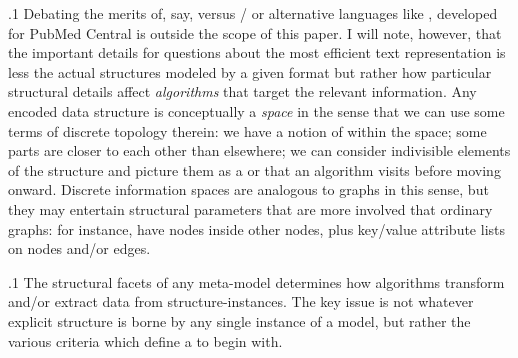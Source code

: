 \documentclass[11pt, twocolumn]{article}
\begin{document}
\p.1{%
Debating the merits of, say,  versus / \mdash{} or
alternative  languages like , developed for
PubMed Central  \mdash{} is outside the scope of this paper.
I will note, however, that the important details
for questions about the most efficient text representation
is less the actual structures modeled by a given format
but rather how particular structural details
affect \textit{algorithms} that target the relevant
information. Any encoded data structure
is conceptually a \textit{space} in the sense
that we can use some terms of discrete topology
therein: we have a notion of  within
the space; some parts are closer to each other
than elsewhere; we can consider indivisible
elements of the structure and picture them
as a  or  that
an algorithm visits before moving onward.
Discrete information spaces are
analogous to graphs in this sense, but
they may entertain structural parameters
that are more involved that ordinary
graphs: for instance, 
have nodes inside other nodes, plus
key/value attribute lists on nodes and/or edges.
}%

\p.1{%
The structural facets of any meta-model
determines how algorithms transform and/or
extract data from structure-instances. The key issue
is not whatever explicit structure is borne by any single
instance of a model, but rather
the various criteria which
define a  to begin with.
}%
\end{document}
